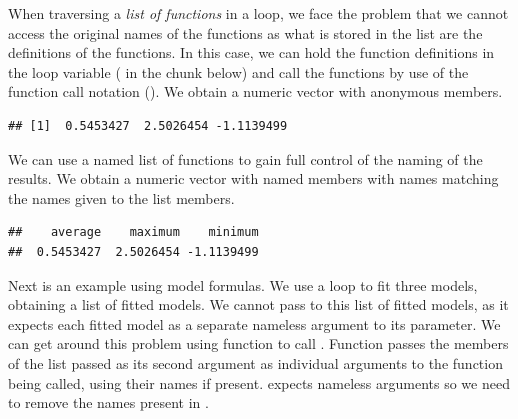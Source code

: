 \documentclass[krantz2]{krantz}\usepackage{knitr}
\begin{document}
When traversing a \emph{list of functions} in a loop, we face the problem that we cannot access the original names of the functions as what is stored in the list are the definitions of the functions. In this case, we can hold the function definitions in the loop variable ( in the chunk below) and call the functions by use of the function call notation (). We obtain a numeric vector with anonymous members.

\begin{knitrout}\footnotesize
{}\color{fgcolor}\begin{kframe}
\begin{alltt}
 \hlkwb{<-} \hlstd{()}
 \hlkwb{<-} 
   
    \hlkwb{<-}  
   \hlstd{\}}
\end{alltt}
\begin{verbatim}
## [1]  0.5453427  2.5026454 -1.1139499
\end{verbatim}
\end{kframe}
\end{knitrout}

We can use a named list of functions to gain full control of the naming of the results. We obtain a numeric vector with named members with names matching the names given to the list members.

\begin{knitrout}\footnotesize
{}\color{fgcolor}\begin{kframe}
\begin{alltt}
 \hlkwb{<-} \hlstd{()}
 \hlkwb{<-} \hlstd{(}     
   
    \hlkwb{<-} 
   \hlstd{\}}
\end{alltt}
\begin{verbatim}
##    average    maximum    minimum
##  0.5453427  2.5026454 -1.1139499
\end{verbatim}
\end{kframe}
\end{knitrout}

Next is an example using model formulas. We use a loop to fit three models, obtaining a list of fitted models. We cannot pass to  this list of fitted models, as it expects each fitted model as a separate nameless argument to its \code{\ldots} parameter. We can get around this problem using function  to call . Function  passes the members of the list passed as its second argument as individual arguments to the function being called, using their names if present.  expects nameless arguments so we need to remove the names present in .
\end{document}
